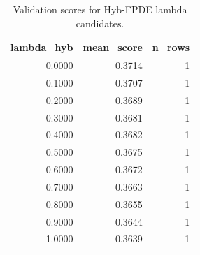 \begin{table}[t]
\caption{Validation scores for Hyb-FPDE lambda candidates.}
\label{tab:lambda_distribution_computed}
\centering
\begin{tabular}{rrr}
\toprule
lambda\_hyb & mean\_score & n\_rows \\
\midrule
0.0000 & 0.3714 & 1 \\
0.1000 & 0.3707 & 1 \\
0.2000 & 0.3689 & 1 \\
0.3000 & 0.3681 & 1 \\
0.4000 & 0.3682 & 1 \\
0.5000 & 0.3675 & 1 \\
0.6000 & 0.3672 & 1 \\
0.7000 & 0.3663 & 1 \\
0.8000 & 0.3655 & 1 \\
0.9000 & 0.3644 & 1 \\
1.0000 & 0.3639 & 1 \\
\bottomrule
\end{tabular}

\end{table}
